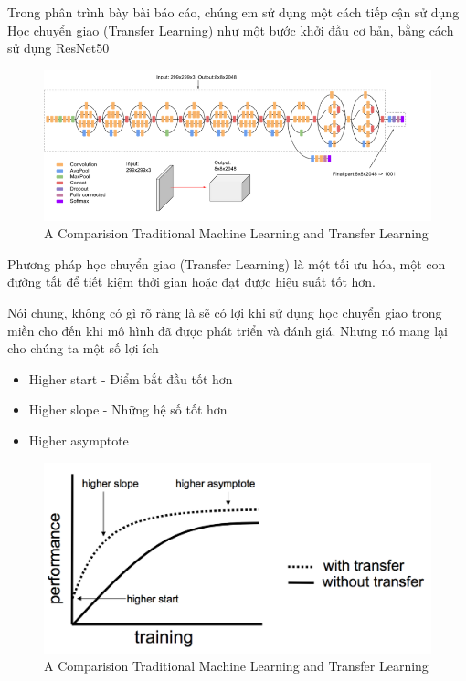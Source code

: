 \documentclass{article}
\begin{document}
	Trong phân trình bày bài báo cáo, chúng em sử dụng một cách tiếp cận sử dụng Học chuyển giao (Transfer Learning) như một bước khởi đầu cơ bản, bằng cách sử dụng ResNet50
	\begin{figure}[H]
		\centering
		\includegraphics[width=1\linewidth]{architecture/Transfer_learning_as_a_starting_point.png}
		\caption{A Comparision Traditional Machine Learning and Transfer Learning}
		\label{fig:writing-thesis}
	\end{figure}
	Phương pháp học chuyển giao (Transfer Learning) là một tối ưu hóa, một con đường tắt để tiết kiệm thời gian hoặc đạt được hiệu suất tốt hơn.
	
	Nói chung, không có gì rõ ràng là sẽ có lợi khi sử dụng học chuyển giao trong miền cho đến khi mô hình đã được phát triển và đánh giá. Nhưng nó mang lại cho chúng ta một số lợi ích
	\begin{itemize}
		\item Higher start - Điểm bắt đầu tốt hơn
		\item Higher slope - Những hệ số tốt hơn
		\item Higher asymptote
	\end{itemize}
	\begin{figure}[H]
		\centering
		\includegraphics[width=1\linewidth]{architecture/performance_transfer_learning.png}
		\caption{A Comparision Traditional Machine Learning and Transfer Learning}
		\label{fig:writing-thesis}
	\end{figure}
\end{document}
